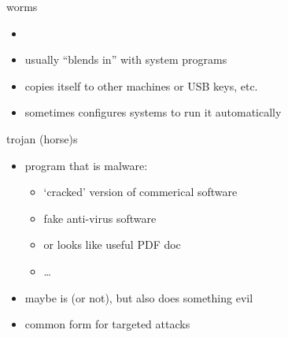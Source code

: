 { %
    \begin{frame}[plain]
    \end{frame}
}

\begin{frame}{worms}
    \begin{itemize}
    \item {}
    \item usually ``blends in'' with system programs
    \item copies itself to other machines or USB keys, etc.
    \item sometimes configures systems to run it automatically
    \end{itemize}
\end{frame}

\begin{frame}{trojan (horse)s}
    \begin{itemize}
    \item {} program that is malware:
        \begin{itemize}
        \item `cracked' version of commerical software
        \item fake anti-virus software
        \item or looks like useful PDF doc
        \item \ldots
        \end{itemize}
    \item maybe is (or not), but also does something evil
    \item common form for targeted attacks
    \end{itemize}
\end{frame}

